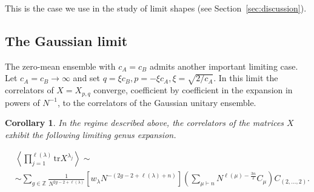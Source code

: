\documentclass{article}
\newcommand{\tr}{\mathrm{tr}}
\theoremstyle{plain}
\newtheorem{cor}[thm]{Corollary}
\theoremstyle{definition}
\numberwithin{equation}{section}
\begin{document}
This is the case we use in the study of limit shapes (see Section~\ref{sec:discussion}).

\subsection{The Gaussian limit}
\label{subs:GUE-limit}

The zero-mean ensemble with $c_A=c_B$ admits another important limiting case. Let $c_A=c_B\to\infty$ and set
$q=\xi c_B, p=-\xi c_A, \xi=\sqrt{2/c_A}$. In this limit the correlators of $X=X_{p,q}$ converge, coefficient by coefficient in the expansion in powers of $N^{-1}$, to the correlators of the Gaussian unitary ensemble.

\begin{cor}
    \label{cor:GUE}
    In the regime described above, the correlators of the matrices $X$ exhibit the following limiting genus expansion.

    \begin{equation}
        \label{eq:Xpq_final_GUE_lemma}
        \begin{aligned}
            & \left\langle \prod_{j=1}^{\ell(\lambda)} \tr X^{\lambda_{j}} \right\rangle \sim \\
            & \sim \sum\limits_{g \in \mathbb{Z}} \frac{1}{N^{2g-2+\ell(\lambda)}}  [w_\lambda N^{-\left(2g-2+\ell(\lambda) + n\right)}] \left(\sum_{\mu \vdash n}N^{\ell(\mu)- \frac{3n}{2}} C_\mu \right) C_{(2,\dots,2)}. 
        \end{aligned}
    \end{equation}
\end{cor}
\end{document}
